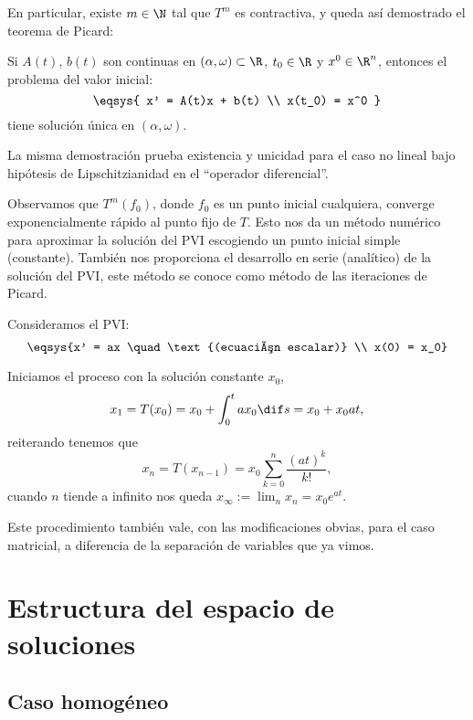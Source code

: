\documentclass[../main.tex]{subfiles}
\begin{document}
En particular, existe \(m \in \N\) tal que \(T^m\) es contractiva, y queda así
demostrado el teorema de Picard:

\begin{theorem}[Picard]
	Si \(A(t)\), \(b(t)\) son continuas en \((\alpha, \omega) \subset \R\), 
	\(t_0 \in \R\) y \(x^0 \in \R^n\), entonces el problema del valor inicial:
	\[\eqsys{
		x' = A(t)x + b(t) \\
		x(t_0) = x^0
		}\]
	tiene solución única en \((\alpha, \omega)\).
\end{theorem}

\begin{remark}
  La misma demostración prueba existencia y unicidad para el caso no lineal bajo
  hipótesis de Lipschitzianidad en el ``operador diferencial''.
\end{remark}

Observamos que \(T^m(f_0)\), donde \(f_0\) es un punto inicial cualquiera,
converge exponencialmente rápido al punto fijo de \(T\). Esto nos da un método
numérico para aproximar la solución del PVI escogiendo un punto inicial simple
(constante). También nos proporciona el desarrollo en serie (analítico) de la
solución del PVI, este método se conoce como método de las iteraciones de
Picard.

\begin{example}
	Consideramos el PVI:
	\[\eqsys{x' = ax \quad \text{(ecuación escalar)} \\
		x(0) = x_0}\]

	Iniciamos el proceso con la solución constante \(x_0\), 
	\[x_1 = T(x_0) = x_0 + \int_0^t a x_0 \dif s = x_0 + x_0 a t,\]
	reiterando tenemos que
	\[x_n = T(x_{n - 1}) = x_0 \sum_{k = 0}^n \frac{(at)^k}{k!},\] cuando \(n\)
    tiende a infinito nos queda \(x_\infty := \lim_n x_n = x_0 e^{at}\).
\end{example}

\begin{remark}
  Este procedimiento también vale, con las modificaciones obvias, para el caso
  matricial, a diferencia de la separación de variables que ya vimos.
\end{remark}

\section{Estructura del espacio de soluciones}

\subsection{Caso homogéneo}
\end{document}

